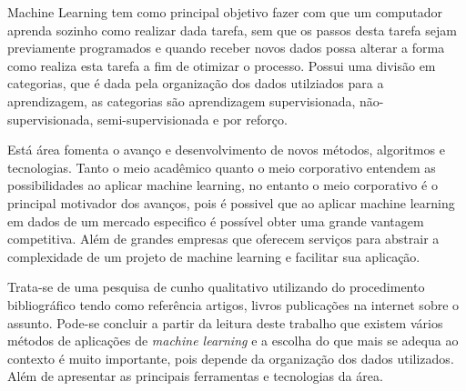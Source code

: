 Machine Learning tem como principal objetivo fazer com 
que um computador aprenda sozinho como realizar dada tarefa, sem que os passos desta tarefa sejam previamente programados e
quando receber novos dados possa alterar a forma como realiza esta tarefa a fim de otimizar o processo. Possui uma divisão
em categorias, que é dada pela organização dos dados utilziados para a aprendizagem, as categorias são aprendizagem supervisionada, não-supervisionada, 
semi-supervisionada e por reforço.   


Está área fomenta o avanço e desenvolvimento de novos métodos, algoritmos e tecnologias. Tanto o meio acadêmico quanto o meio 
corporativo entendem as possibilidades ao aplicar machine learning, no entanto o meio corporativo é o principal motivador 
dos avanços, pois é possivel que ao aplicar machine learning em dados de um mercado especifico é possível obter uma grande
vantagem competitiva. Além de grandes empresas que oferecem serviços para abstrair a complexidade de um projeto de 
machine learning e facilitar sua aplicação. 

Trata-se de uma pesquisa de cunho qualitativo utilizando do procedimento
bibliográfico tendo como referência artigos, livros publicações na internet sobre o assunto. Pode-se concluir a partir da 
leitura deste trabalho que existem vários métodos de aplicações de \textit{machine learning} e a escolha do que mais 
se adequa ao contexto é muito importante, pois depende da organização dos dados utilizados. 
Além de apresentar as principais ferramentas e tecnologias da área.   



